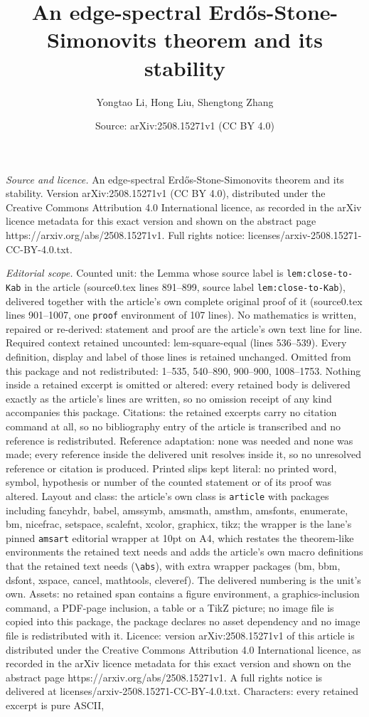 \documentclass[10pt,a4paper]{amsart}
\title[An edge-spectral Erd\H{o}s-Stone-Simonovits theorem and its ]{An edge-spectral Erd\H{o}s-Stone-Simonovits theorem and its stability}
\author{Yongtao Li, Hong Liu, Shengtong Zhang}
\date{Source: arXiv:2508.15271v1 (CC BY 4.0)}
\begin{document}
\maketitle

\noindent\emph{Source and licence.} An edge-spectral Erd\H{o}s-Stone-Simonovits theorem and its stability. Version arXiv:2508.15271v1 (CC BY 4.0), distributed under the Creative Commons Attribution 4.0 International licence, as recorded in the arXiv licence metadata for this exact version and shown on the abstract page https://arxiv.org/abs/2508.15271v1. Full rights notice: licenses/arxiv-2508.15271-CC-BY-4.0.txt.\par\smallskip

\noindent\textit{Editorial scope.} Counted unit: the Lemma whose source label is \texttt{lem:close-to-Kab} in the article (source0.tex lines 891--899, source label \texttt{lem:close-to-Kab}), delivered together with the article's own complete original proof of it (source0.tex lines 901--1007, one \texttt{proof} environment of 107 lines). No mathematics is written, repaired or re-derived: statement and proof are the article's own text line for line. Required context retained uncounted: lem-square-equal (lines 536--539). Every definition, display and label of those lines is retained unchanged. Omitted from this package and not redistributed: 1--535, 540--890, 900--900, 1008--1753. Nothing inside a retained excerpt is omitted or altered: every retained body is delivered exactly as the article's lines are written, so no omission receipt of any kind accompanies this package. Citations: the retained excerpts carry no citation command at all, so no bibliography entry of the article is transcribed and no reference is redistributed. Reference adaptation: none was needed and none was made; every reference inside the delivered unit resolves inside it, so no unresolved reference or citation is produced. Printed slips kept literal: no printed word, symbol, hypothesis or number of the counted statement or of its proof was altered. Layout and class: the article's own class is \texttt{article} with packages including fancyhdr, babel, amssymb, amsmath, amsthm, amsfonts, enumerate, bm, nicefrac, setspace, scalefnt, xcolor, graphicx, tikz; the wrapper is the lane's pinned \texttt{amsart} editorial wrapper at 10pt on A4, which restates the theorem-like environments the retained text needs and adds the article's own macro definitions that the retained text needs (\texttt{\textbackslash abs}), with extra wrapper packages (bm, bbm, dsfont, xspace, cancel, mathtools, cleveref). The delivered numbering is the unit's own. Assets: no retained span contains a figure environment, a graphics-inclusion command, a PDF-page inclusion, a table or a TikZ picture; no image file is copied into this package, the package declares no asset dependency and no image file is redistributed with it. Licence: version arXiv:2508.15271v1 of this article is distributed under the Creative Commons Attribution 4.0 International licence, as recorded in the arXiv licence metadata for this exact version and shown on the abstract page https://arxiv.org/abs/2508.15271v1. A full rights notice is delivered at licenses/arxiv-2508.15271-CC-BY-4.0.txt. Characters: every retained excerpt is pure ASCII, 
\end{document}
